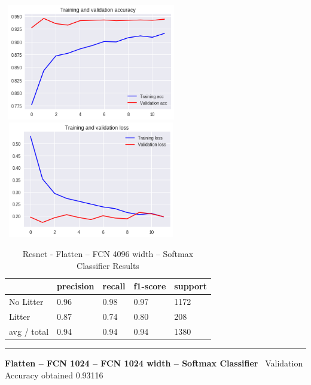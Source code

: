 \documentclass{IEEEtran}
\begin{document}
 \includegraphics[width=3in,height=2in]{resnet-img/resnet-img007.png} 
\includegraphics[width=3in,height=2in]{resnet-img/resnet-img008.png} 

\begin{table}[ht]
\centering
\caption{Resnet - Flatten -- FCN 4096 width -- Softmax Classifier Results}
\begin{tabular}{|l|l|l|l|l|} 
\hline
 & precision & recall  & f1-score  & support \\\hline
No Litter  &
0.96  &
0.98  &
0.97  &
1172 \\\hline
Litter  &
0.87  &
0.74  &
0.80  &
208 \\\hline
avg / total  &
0.94  &
0.94  &
0.94  &
1380\\\hline
\end{tabular}
\end{table}

\begin{center}\noindent\rule{8cm}{0.4pt}\end{center}

\textbf{Flatten -- FCN 1024 -- FCN 1024 width -- Softmax Classifier} \ 
Validation Accuracy obtained 0.93116
\end{document}
